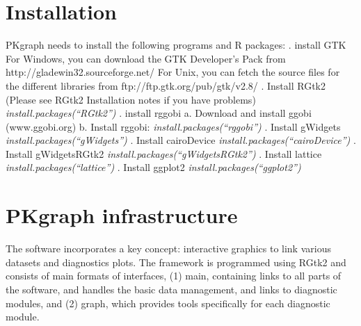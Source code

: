 \documentclass[a4paper]{article}
\begin{document}
\section{Installation}
PKgraph needs to install the following programs and R packages:
\newline {}. install GTK \newline
For Windows, you can download the GTK Developer's Pack from
\newline
   http://gladewin32.sourceforge.net/
\newline
\newline
For Unix, you can fetch the source files for the different
libraries from
\newline
   ftp://ftp.gtk.org/pub/gtk/v2.8/
\newline
{}. Install RGtk2 (Please see RGtk2 Installation notes if you have problems) \newline
\textit{install.packages(``RGtk2'')} \newline {}. install rggobi   \newline
a. Download and install ggobi (www.ggobi.org)  \newline
b. Install rggobi: \textit{install.packages(``rggobi'')} \newline {}. Install gWidgets  \newline
\textit{install.packages(``gWidgets'')} \newline {}. Install cairoDevice \newline
\textit{install.packages(``cairoDevice'')} \newline {}. Install gWidgetsRGtk2 \newline
\textit{install.packages(``gWidgetsRGtk2'')} \newline {}. Install lattice  \newline
\textit{install.packages(``lattice'')} \newline {}. Install ggplot2  \newline
\textit{install.packages(``ggplot2'')} \newline \newline
\section{PKgraph infrastructure}
The software incorporates a key concept: interactive graphics to link various datasets and diagnostics plots. The framework is programmed using RGtk2 and consists of main formats of interfaces,
(1) main, containing links to all parts of the software, and handles the basic data management, and links to diagnostic modules, and (2) graph, which provides tools specifically for each diagnostic module. 
\newline
\newline
\end{document}
